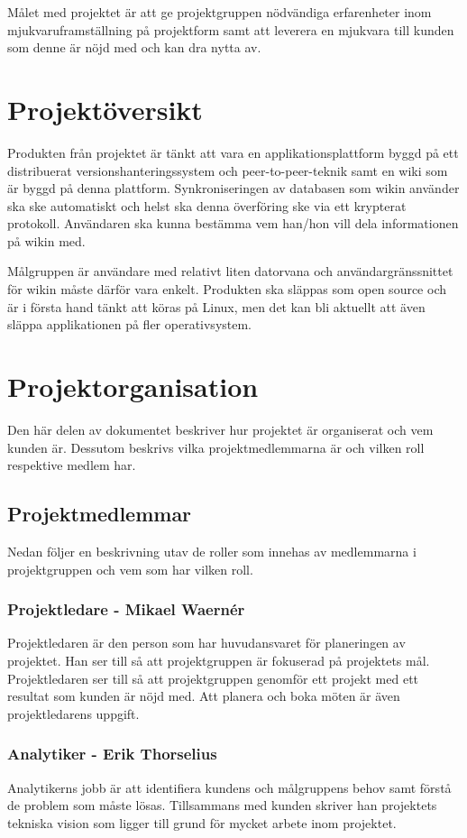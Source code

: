 Målet med projektet är att ge projektgruppen nödvändiga erfarenheter inom mjukvaruframställning på projektform samt att leverera en mjukvara till kunden som denne är nöjd med och kan dra nytta av.

\section{Projektöversikt}
Produkten från projektet är tänkt att vara en applikationsplattform byggd på ett distribuerat versionshanteringssystem och peer-to-peer-teknik samt en wiki som är byggd på denna plattform. Synkroniseringen av databasen som wikin använder ska ske automatiskt och helst ska denna överföring ske via ett krypterat protokoll. Användaren ska kunna bestämma vem han/hon vill dela informationen på wikin med.

Målgruppen är användare med relativt liten datorvana och användargränssnittet för wikin måste därför vara enkelt. Produkten ska släppas som open source och är i första hand tänkt att köras på Linux, men det kan bli aktuellt att även släppa applikationen på fler operativsystem.

\section{Projektorganisation}
Den här delen av dokumentet beskriver hur projektet är organiserat och vem kunden är. Dessutom beskrivs vilka projektmedlemmarna är och vilken roll respektive medlem har.

\subsection{Projektmedlemmar}
Nedan följer en beskrivning utav de roller som innehas av medlemmarna i projektgruppen och vem som har vilken roll.

\subsubsection*{Projektledare - Mikael Waernér}
Projektledaren är den person som har huvudansvaret för planeringen av projektet. Han ser till så att projektgruppen är fokuserad på projektets mål. Projektledaren ser till så att projektgruppen genomför ett projekt med ett resultat som kunden är nöjd med. Att planera och boka möten är även projektledarens uppgift.

\subsubsection*{Analytiker - Erik Thorselius}
Analytikerns jobb är att identifiera kundens och målgruppens behov samt förstå de problem som måste lösas. Tillsammans med kunden skriver han projektets tekniska vision som ligger till grund för mycket arbete inom projektet.

